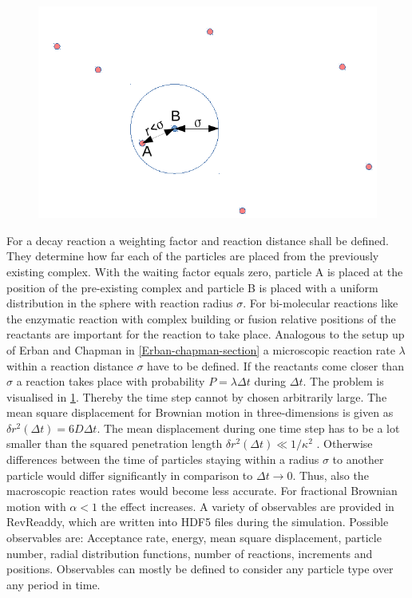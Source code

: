 \documentclass[
  a4paper,BCOR10mm,oneside,
  headsepline,footsepline,%
  fleqn,openbib
]{scrbook}
\begin{document}
\begin{figure} 
  \centering
  \includegraphics[width=0.7 \textwidth]{./data/schemeforreacions1.png}
  \captionsetup{width=\linewidth}
  \label{fig:model-reactions}
\end{figure}
\par
For a decay reaction a weighting factor and reaction distance shall be defined. They determine how far each of the particles are placed from the previously existing complex. With the waiting factor equals zero, particle A is placed at the position of the pre-existing complex and particle B is placed with a uniform distribution in the sphere with reaction radius $\sigma$. For bi-molecular reactions like the enzymatic reaction with complex building  or fusion  relative positions of the reactants are important for the reaction to take place. Analogous to the setup up of Erban and Chapman in \cref{Erban-chapman-section} a microscopic reaction rate $\lambda$ within a reaction distance $\sigma$ have to be defined. If the reactants come closer than $\sigma$ a reaction takes place with probability $P= \lambda \Delta t$ during $\Delta t$. The problem is visualised in \cref{fig:model-reactions}. Thereby the time step cannot by chosen arbitrarily large. The mean square displacement for Brownian motion in three-dimensions is given as $\delta r^2(\Delta t)= 6D \Delta t$. The mean displacement during one time step has to be a lot smaller than the squared penetration length $\delta r^2(\Delta t)\ll 1/\kappa^2$ . Otherwise differences between the time of particles staying within a radius $\sigma$ to another particle would differ significantly in comparison to $\Delta t \rightarrow 0$. Thus, also the macroscopic reaction rates would become less accurate. For fractional Brownian motion with $\alpha<1$ the effect increases. A variety of observables are provided in RevReaddy, which are written into HDF5 files \cite{hdf5} during the simulation. Possible observables are: Acceptance rate, energy, mean square displacement, particle number, radial distribution functions, number of reactions, increments and positions. Observables can mostly be defined to consider any particle type over any period in time. 
\end{document}
